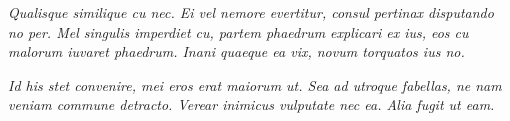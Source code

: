 \documentclass[10pt]{article}
\begin{document}
\begin{textblock}{23}
\textit{Qualisque similique cu nec. Ei vel nemore evertitur, consul pertinax
disputando no per. Mel singulis imperdiet cu, partem phaedrum explicari ex ius,
eos cu malorum iuvaret phaedrum. Inani quaeque ea vix, novum torquatos ius no.}

\textit{Id his stet convenire, mei eros erat maiorum ut. Sea ad utroque
fabellas, ne nam veniam commune detracto. Verear inimicus vulputate nec ea.
Alia fugit ut eam.}

\end{textblock}
\end{document}
